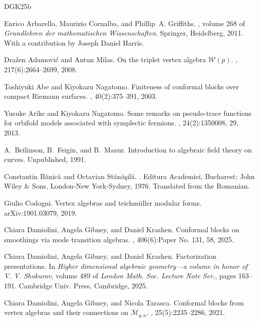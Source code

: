 \documentclass[11pt,b5paper,notitlepage]{article}
\theoremstyle{definition}
\theoremstyle{plain}
\newcommand{\<}{\left\langle}
\renewcommand{\>}{\right\rangle}
\numberwithin{equation}{section}
\begin{document}
\begin{thebibliography}{DGK25b}

Enrico Arbarello, Maurizio Cornalba, and Phillip~A. Griffiths.
, volume 268 of {\em
  Grundlehren der mathematischen Wissenschaften}.
\newblock Springer, Heidelberg, 2011.
\newblock With a contribution by Joseph Daniel Harris.

Dra{\v{z}}en Adamovi{\'c} and Antun Milas.
\newblock On the triplet vertex algebra {{\(\mathcal W(p)\)}}.
, 217(6):2664--2699, 2008.

Toshiyuki Abe and Kiyokazu Nagatomo.
\newblock Finiteness of conformal blocks over compact {Riemann} surfaces.
, 40(2):375--391, 2003.

Yusuke Arike and Kiyokazu Nagatomo.
\newblock Some remarks on pseudo-trace functions for orbifold models associated
  with symplectic fermions.
, 24(2):1350008, 29, 2013.

A.~Beilinson, B.~Feigin, and B.~Mazur.
\newblock Introduction to algebraic field theory on curves.
\newblock Unpublished, 1991.

Constantin B\u{a}nic\u{a} and Octavian St\u{a}n\u{a}\c{s}il\u{a}.
.
\newblock Editura Academiei, Bucharest; John Wiley \& Sons, London-New
  York-Sydney, 1976.
\newblock Translated from the Romanian.

Giulio Codogni.
\newblock Vertex algebras and teichmüller modular forms.
\newblock arXiv:1901.03079, 2019.

Chiara Damiolini, Angela Gibney, and Daniel Krashen.
\newblock Conformal blocks on smoothings via mode transition algebras.
, 406(6):Paper No. 131, 58, 2025.

Chiara Damiolini, Angela Gibney, and Daniel Krashen.
\newblock Factorization presentations.
\newblock In {\em Higher dimensional algebraic geometry---a volume in honor of
  {V}. {V}. {S}hokurov}, volume 489 of {\em London Math. Soc. Lecture Note
  Ser.}, pages 163--191. Cambridge Univ. Press, Cambridge, 2025.

Chiara Damiolini, Angela Gibney, and Nicola Tarasca.
\newblock Conformal blocks from vertex algebras and their connections on
  {$\overline{\mathcal M}_{g, n}$}.
, 25(5):2235--2286, 2021.


\end{thebibliography}
\end{document}
